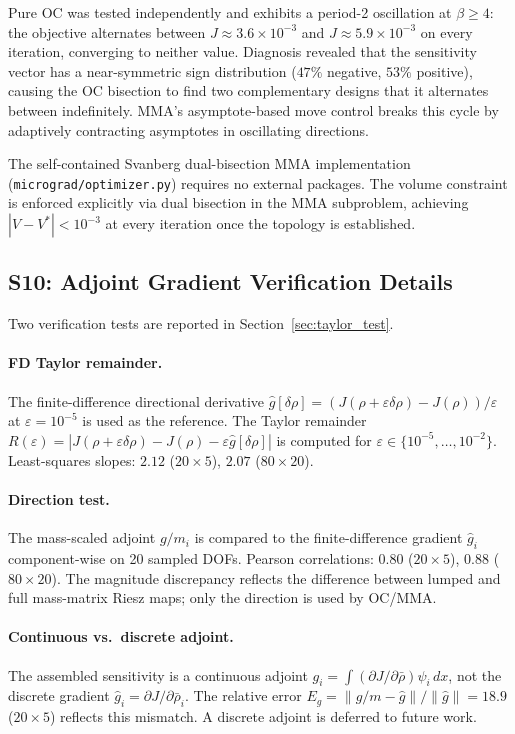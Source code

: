 Pure OC was tested independently and exhibits a period-2 oscillation
at $\beta \geq 4$: the objective alternates between
$J \approx 3.6\times10^{-3}$ and $J \approx 5.9\times10^{-3}$ on
every iteration, converging to neither value.
Diagnosis revealed that the sensitivity vector has a near-symmetric
sign distribution ($47\%$ negative, $53\%$ positive), causing the
OC bisection to find two complementary designs that it alternates
between indefinitely.
MMA's asymptote-based move control breaks this cycle by adaptively
contracting asymptotes in oscillating directions.

The self-contained Svanberg dual-bisection MMA implementation
(\texttt{micrograd/optimizer.py}) requires no external packages.
The volume constraint is enforced explicitly via dual bisection
in the MMA subproblem, achieving $|V - V^*| < 10^{-3}$ at every
iteration once the topology is established.

\subsection*{S10: Adjoint Gradient Verification Details}
\label{sec:s10}

Two verification tests are reported in Section~\ref{sec:taylor_test}.

\paragraph{FD Taylor remainder.}
The finite-difference directional derivative
$\hat{g}[\delta\rho] = (J(\rho+\varepsilon\delta\rho)-J(\rho))/\varepsilon$
at $\varepsilon=10^{-5}$ is used as the reference.
The Taylor remainder $R(\varepsilon) = |J(\rho+\varepsilon\delta\rho)-J(\rho)-\varepsilon\hat{g}[\delta\rho]|$ is computed for
$\varepsilon\in\{10^{-5},\ldots,10^{-2}\}$.
Least-squares slopes: $2.12$ ($20\times5$), $2.07$ ($80\times20$).

\paragraph{Direction test.}
The mass-scaled adjoint $g/m_i$ is compared to the finite-difference
gradient $\hat{g}_i$ component-wise on 20 sampled DOFs.
Pearson correlations: $0.80$ ($20\times5$), $0.88$ ($80\times20$).
The magnitude discrepancy reflects the difference between lumped and
full mass-matrix Riesz maps; only the direction is used by OC/MMA.

\paragraph{Continuous vs.\ discrete adjoint.}
The assembled sensitivity is a continuous adjoint
$g_i=\int(\partial J/\partial\bar\rho)\psi_i\,dx$,
not the discrete gradient $\hat{g}_i=\partial J/\partial\bar\rho_i$.
The relative error $E_g = \|g/m - \hat{g}\|/\|\hat{g}\| = 18.9$
($20\times5$) reflects this mismatch. A discrete adjoint is deferred
to future work.

